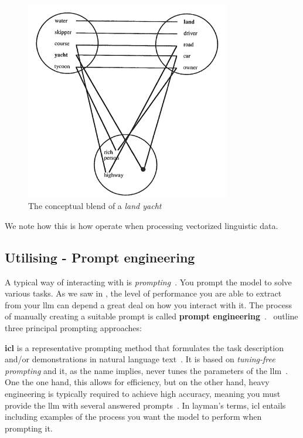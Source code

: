 \begin{figure}[h]
    \centering
    \includegraphics[width=0.8\textwidth]{figures/landYacht.png}
    \caption[Land yacht conceptual blend]{The conceptual blend of a \textit{land
            yacht}\footnotemark}\label{fig:landYacht}
\end{figure}


We note how this is how  operate when processing vectorized
linguistic data.


\subsection{Utilising  - Prompt engineering}\label{sec:llmUtilization}


A typical way of interacting with  is \textit{prompting}~\cite[44]{llmSurvey}. You
prompt the model to solve various tasks. As we saw in , the level of
performance you are able to extract from your \acrlong{llm} can depend a great deal on how you
interact with it. The process of manually creating a suitable prompt is called \textbf{prompt
    engineering}~\cite[44]{llmSurvey}.~\citeauthor{llmSurvey} outline three principal prompting
approaches:

\textbf{\acrfull{icl}} is a representative prompting method that formulates the task
description and/or demonstrations in natural language text~\cite[44]{llmSurvey}. It is based on
\textit{tuning-free prompting} and it, as the name implies, never tunes the parameters of the
\acrshort{llm}~\cite[15]{promptingSurvey}. One the one hand, this allows for efficiency, but on the
other hand, heavy engineering is typically required to achieve high accuracy, meaning you must
provide the \acrshort{llm} with several answered prompts~\cite[16]{promptingSurvey}. In layman's
terms, \acrshort{icl} entails including examples of the process you want the model to perform when
prompting it.

